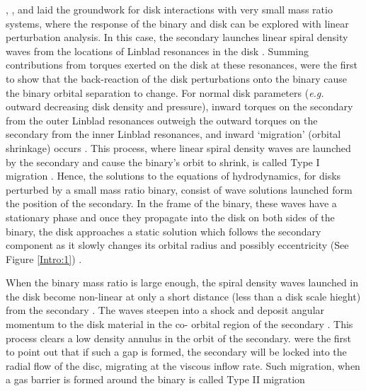 \cite{LinPapa:1979a}, \cite{GT79}, and \cite{GT80} laid the groundwork for
disk interactions with very small mass ratio systems, where the response of
the binary and disk can be explored with linear perturbation analysis. In this
case, the secondary launches linear spiral density waves from the locations of
Linblad resonances in the disk \citep{LyndenBellKalnajs:1972}. Summing
contributions from torques exerted on the disk at these resonances,
\cite{GT80} were the first to show that the back-reaction of the disk
perturbations onto the binary cause the binary orbital separation to change.
For normal disk parameters (\emph{e.g.} outward decreasing disk density and
pressure), inward torques on the secondary from the outer Linblad resonances
outweigh the outward torques on the secondary from the inner Linblad
resonances, and inward `migration' (orbital shrinkage) occurs
\cite{Ward:1986}. This process, where linear spiral density waves are launched
by the secondary and cause the binary's orbit to shrink, is called Type I
migration \citep[See also][]{MeyerVernetSicardy:1987, Ward:1997, Tanaka:2002}.
Hence, the solutions to the equations of hydrodynamics, for disks perturbed by
a small mass ratio binary, consist of wave solutions launched form the
position of the secondary. In the frame of the binary, these waves have a
stationary phase and once they propagate into the disk on both sides of the
binary, the disk approaches a static solution which follows the secondary
component as it slowly changes its orbital radius and possibly eccentricity
(See Figure \ref{Intro:1}) \citep{GT80, Ward:1988, GoldriechSari:2003}.





When the binary mass ratio is large enough, the spiral density waves launched
in the disk become non-linear at only a short distance (less than a disk scale
hieght) from the secondary \citep{GoodmanRafikov:2001}. The waves steepen into
a shock and deposit angular momentum to the disk material in the co- orbital
region of the secondary \citep{RafikovDong:2012, LinPapa, chapter 3...}. This
process clears a low density annulus in the orbit of the secondary.
\cite{LinPapa:1986b} were the first to point out that if such a gap is formed,
the secondary will be locked into the radial flow of the disc, migrating at
the viscous inflow rate. Such migration, when a gas barrier is formed around
the binary is called Type II migration \citep[see also][and Chapter 3]{Ward:1997, KleyNelson:2013, other type II refs}



